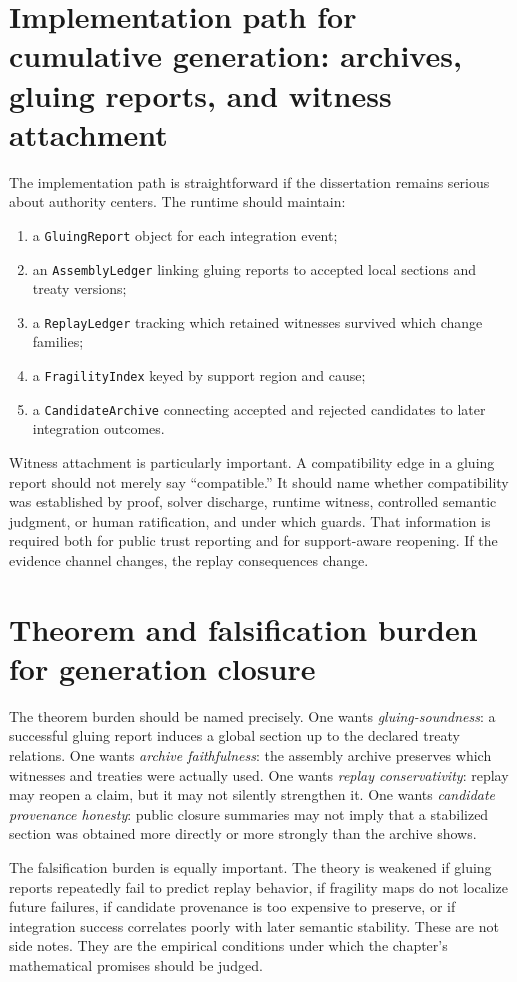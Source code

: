 \documentclass[11pt]{report}
\begin{document}
\section{Implementation path for cumulative generation: archives, gluing reports, and witness attachment}
The implementation path is straightforward if the dissertation remains serious about authority centers. The runtime should maintain:
\begin{enumerate}
\item a \texttt{GluingReport} object for each integration event;
\item an \texttt{AssemblyLedger} linking gluing reports to accepted local sections and treaty versions;
\item a \texttt{ReplayLedger} tracking which retained witnesses survived which change families;
\item a \texttt{FragilityIndex} keyed by support region and cause;
\item a \texttt{CandidateArchive} connecting accepted and rejected candidates to later integration outcomes.
\end{enumerate}

Witness attachment is particularly important. A compatibility edge in a gluing report should not merely say ``compatible.'' It should name whether compatibility was established by proof, solver discharge, runtime witness, controlled semantic judgment, or human ratification, and under which guards. That information is required both for public trust reporting and for support-aware reopening. If the evidence channel changes, the replay consequences change.

\section{Theorem and falsification burden for generation closure}
The theorem burden should be named precisely. One wants \emph{gluing-soundness}: a successful gluing report induces a global section up to the declared treaty relations. One wants \emph{archive faithfulness}: the assembly archive preserves which witnesses and treaties were actually used. One wants \emph{replay conservativity}: replay may reopen a claim, but it may not silently strengthen it. One wants \emph{candidate provenance honesty}: public closure summaries may not imply that a stabilized section was obtained more directly or more strongly than the archive shows.

The falsification burden is equally important. The theory is weakened if gluing reports repeatedly fail to predict replay behavior, if fragility maps do not localize future failures, if candidate provenance is too expensive to preserve, or if integration success correlates poorly with later semantic stability. These are not side notes. They are the empirical conditions under which the chapter's mathematical promises should be judged.
\end{document}
